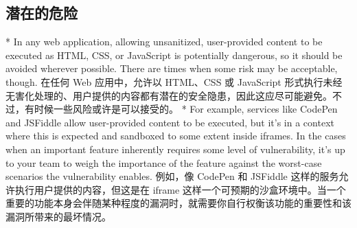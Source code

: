 \begin{paracol}{2}
\subsection{潜在的危险}
\switchcolumn[0]*%
In any web application, allowing unsanitized, user-provided content to
be executed as HTML, CSS, or JavaScript is potentially dangerous, so it
should be avoided wherever possible. There are times when some risk may
be acceptable, though.
\switchcolumn
在任何 Web 应用中，允许以 HTML、CSS 或 JavaScript
形式执行未经无害化处理的、用户提供的内容都有潜在的安全隐患，因此这应尽可能避免。不过，有时候一些风险或许是可以接受的。
\switchcolumn[0]*%
For example, services like CodePen and JSFiddle allow user-provided
content to be executed, but it's in a context where this is expected and
sandboxed to some extent inside iframes. In the cases when an important
feature inherently requires some level of vulnerability, it's up to your
team to weigh the importance of the feature against the worst-case
scenarios the vulnerability enables.
\switchcolumn
例如，像 CodePen 和 JSFiddle 这样的服务允许执行用户提供的内容，但这是在
iframe
这样一个可预期的沙盒环境中。当一个重要的功能本身会伴随某种程度的漏洞时，就需要你自行权衡该功能的重要性和该漏洞所带来的最坏情况。
\end{paracol}


